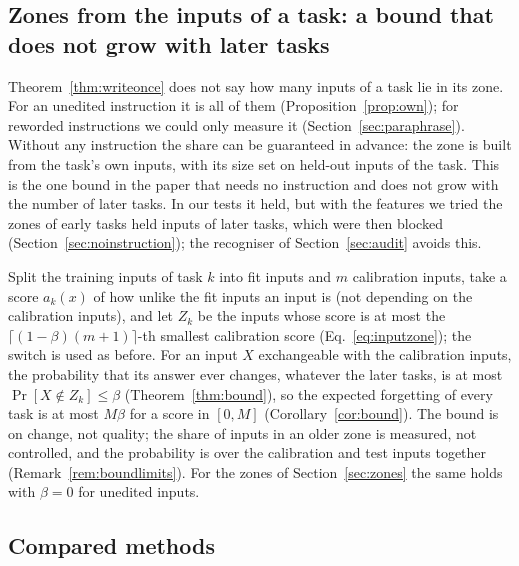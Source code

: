 \subsection{Zones from the inputs of a task: a bound that does not grow with later tasks}
\label{sec:bound}

Theorem~\ref{thm:writeonce} does not say how many inputs of a task lie in its zone. For an unedited
instruction it is all of them (Proposition~\ref{prop:own}); for reworded instructions we could only
measure it (Section~\ref{sec:paraphrase}). Without any instruction the share can be guaranteed in
advance: the zone is built from the task's own inputs, with its size set on held-out inputs of the
task. This is the one bound in the paper that needs no instruction and does not grow with the
number of later tasks. In our tests it held, but with the features we tried the zones of early
tasks held inputs of later tasks, which were then blocked (Section~\ref{sec:noinstruction}); the
recogniser of Section~\ref{sec:audit} avoids this.

Split the training inputs of task $k$ into fit inputs and $m$ calibration inputs, take a score
$a_k(x)$ of how unlike the fit inputs an input is (not depending on the calibration inputs), and let
$Z_k$ be the inputs whose score is at most the $\lceil (1-\beta)(m+1)\rceil$-th smallest calibration
score (Eq.~\eqref{eq:inputzone}); the switch is used as before. For an input $X$ exchangeable with the
calibration inputs, the probability that its answer ever changes, whatever the later tasks, is at
most $\Pr[X\notin Z_k]\le\beta$ (Theorem~\ref{thm:bound}), so the expected forgetting of every task
is at most $M\beta$ for a score in $[0,M]$ (Corollary~\ref{cor:bound}). The bound is on change, not
quality; the share of inputs in an older zone is measured, not controlled, and the probability is
over the calibration and test inputs together (Remark~\ref{rem:boundlimits}). For the zones of
Section~\ref{sec:zones} the same holds with $\beta = 0$ for unedited inputs.

\subsection{Compared methods}
\label{sec:compared}

